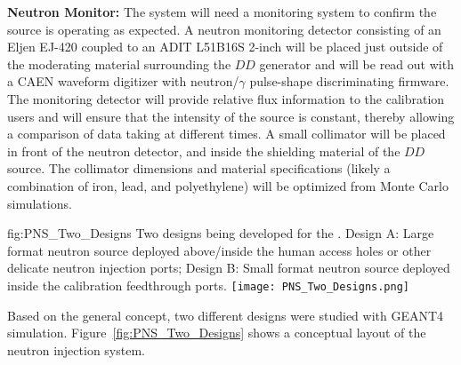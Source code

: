 {\bf Neutron Monitor:} The system will need a monitoring system to confirm the source is operating as expected.  A neutron monitoring detector consisting of an Eljen EJ-420 coupled to an ADIT L51B16S \num{2}-inch  will be placed just outside of the moderating material surrounding the $DD$ generator and will be read out with a CAEN waveform digitizer with neutron/$\gamma$ pulse-shape discriminating firmware. The monitoring detector will provide relative flux information to the calibration users and will ensure that the intensity of the source is constant, thereby allowing a comparison of data taking at different times.  A small collimator will be placed in front of the neutron detector, and inside the shielding material of the $DD$ source. The collimator dimensions and material specifications (likely a combination of iron, lead, and polyethylene) will be optimized from Monte Carlo simulations.

\begin{dunefigure}{fig:PNS_Two_Designs}
{Two designs being developed for the . Design A: Large format neutron source deployed above/inside the human access holes or other delicate neutron injection ports; Design B: Small format neutron source deployed inside the calibration feedthrough ports.}
\texttt{[image: PNS\_Two\_Designs.png]}
\end{dunefigure}

Based on the general concept, two different designs were studied with GEANT4 simulation. Figure~\ref{fig:PNS_Two_Designs} shows a conceptual layout of the neutron injection system. %

